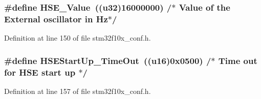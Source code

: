 \subsubsection[{\texorpdfstring{H\+S\+E\+\_\+\+Value}{HSE_Value}}]{\setlength{\rightskip}{0pt plus 5cm}\#define H\+S\+E\+\_\+\+Value~(({\bf u32})16000000) /$\ast$ Value of the External oscillator in Hz$\ast$/}\hypertarget{bsp_2boards_2iot-lab___m3_2configure_2stm32f10x__conf_8h_ab12a1abe6dd0001e7a0487a8b175b28c}{}\label{bsp_2boards_2iot-lab___m3_2configure_2stm32f10x__conf_8h_ab12a1abe6dd0001e7a0487a8b175b28c}


Definition at line 150 of file stm32f10x\+\_\+conf.\+h.

\subsubsection[{\texorpdfstring{H\+S\+E\+Start\+Up\+\_\+\+Time\+Out}{HSEStartUp_TimeOut}}]{\setlength{\rightskip}{0pt plus 5cm}\#define H\+S\+E\+Start\+Up\+\_\+\+Time\+Out~(({\bf u16})0x0500) /$\ast$ Time out for H\+S\+E start up $\ast$/}\hypertarget{bsp_2boards_2iot-lab___m3_2configure_2stm32f10x__conf_8h_a7e69dacd5c3b950b5b1786d7336b30d3}{}\label{bsp_2boards_2iot-lab___m3_2configure_2stm32f10x__conf_8h_a7e69dacd5c3b950b5b1786d7336b30d3}


Definition at line 157 of file stm32f10x\+\_\+conf.\+h.

